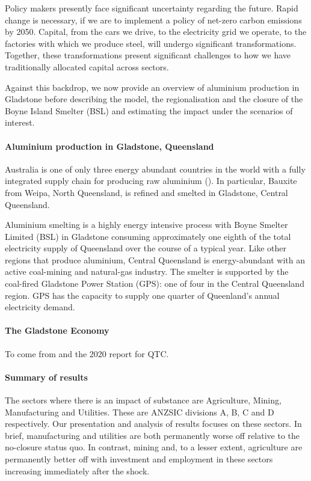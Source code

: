 \documentclass[12pt,a4paper]{article}
\begin{document}
Policy makers presently face significant uncertainty regarding the future.
Rapid change is necessary, if we are to implement a policy of net-zero carbon
emissions by 2050. Capital, from the cars we drive, to the electricity grid we
operate, to the factories with which we produce steel, will undergo significant
transformations. Together, these transformations present significant challenges
to how we have traditionally allocated capital across sectors.

Against this backdrop, we now provide an overview of aluminium production in
Gladstone before describing the model, the regionalisation and the closure of
the Boyne Island Smelter (BSL) and estimating the impact under the scenarios of
interest.

\paragraph{Aluminium production in Gladstone, Queensland} Australia is one of
only three energy abundant countries in the world with a fully integrated
supply chain for producing raw aluminium (\cite{GN-Aluminium-smelters}). In
particular, Bauxite from Weipa, North Queensland, is refined and smelted in
Gladstone, Central Queensland.

Aluminium smelting is a highly energy intensive process with Boyne Smelter
Limited (BSL) in Gladstone consuming approximately one eighth of the total
electricity supply of Queensland over the course of a typical year. Like other
regions that produce aluminium, Central Queensland is energy-abundant with an
active coal-mining and natural-gas industry. The smelter is supported by the
coal-fired Gladstone Power Station (GPS): one of four in the Central
Queensland region. GPS has the capacity to supply one quarter of Queenland's
annual electricity demand.

\paragraph{The Gladstone Economy} To come from \cite{glad-prospectus} and
the 2020 report for QTC.


\paragraph{Summary of results}





The sectors where there is an impact of
substance are Agriculture, Mining, Manufacturing and Utilities. These are
ANZSIC divisions A, B, C and D respectively. Our presentation and analysis of
results focuses on these sectors.  In brief, manufacturing and utilities are
both permanently worse off relative to the no-closure status quo.  In contrast,
mining and, to a lesser extent, agriculture are permanently better off with
investment and employment in these sectors increasing immediately after the
shock.
\end{document}
